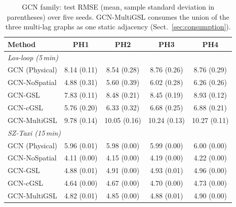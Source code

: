 \begin{table}[t]
\centering
\caption{GCN family: test RMSE (mean, sample standard deviation in
parentheses) over five seeds. GCN-MultiGSL consumes the union of the three
multi-lag graphs as one static adjacency (Sect.~\ref{sec:consumption}).}
\label{tab:gcn-main}
\small
\begin{tabular}{lcccc}
\toprule
Method & PH1 & PH2 & PH3 & PH4 \\
\midrule
\multicolumn{5}{l}{\textit{Los-loop (5\,min)}} \\
GCN (Physical) & 8.14 (0.11) & 8.54 (0.28) & 8.76 (0.26) & 8.76 (0.29) \\
GCN-NoSpatial & 4.88 (0.31) & 5.60 (0.39) & 6.02 (0.28) & 6.26 (0.26) \\
GCN-GSL & 7.83 (0.11) & 8.48 (0.21) & 8.45 (0.19) & 8.93 (0.12) \\
GCN-cGSL & 5.76 (0.20) & 6.33 (0.32) & 6.68 (0.25) & 6.88 (0.21) \\
GCN-MultiGSL & 9.78 (0.14) & 10.05 (0.16) & 10.24 (0.13) & 10.27 (0.11) \\
\midrule
\multicolumn{5}{l}{\textit{SZ-Taxi (15\,min)}} \\
GCN (Physical) & 5.96 (0.01) & 5.98 (0.00) & 5.99 (0.00) & 6.00 (0.00) \\
GCN-NoSpatial & 4.11 (0.00) & 4.15 (0.00) & 4.19 (0.00) & 4.22 (0.00) \\
GCN-GSL & 4.88 (0.01) & 4.91 (0.00) & 4.93 (0.01) & 4.96 (0.00) \\
GCN-cGSL & 4.64 (0.00) & 4.67 (0.00) & 4.70 (0.00) & 4.73 (0.00) \\
GCN-MultiGSL & 4.82 (0.01) & 4.85 (0.00) & 4.88 (0.01) & 4.90 (0.00) \\
\bottomrule
\end{tabular}
\end{table}

